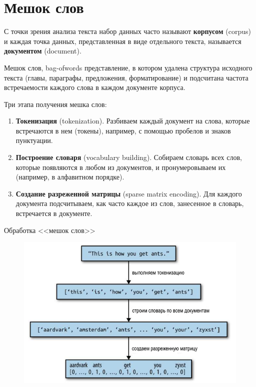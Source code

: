 \documentclass{beamer}
\begin{document}
\section{Мешок слов}

\begin{frame}
С точки зрения анализа текста набор данных часто называют \textbf{корпусом} (corpus) и каждая точка данных, представленная в виде отдельного текста, называется \textbf{документом} (document). 
\begin{block}{Мешок слов, bag-ofwords}
представление, в котором удалена структура исходного текста (главы, параграфы, предложения, форматирование) и подсчитана частота встречаемости каждого слова в каждом документе корпуса.
\end{block}
Три этапа получения мешка слов:
\begin{enumerate}
\item \textbf{Токенизация} (tokenization). Разбиваем каждый документ на слова, которые встречаются в нем (токены), например, с помощью пробелов и знаков пунктуации.
\item \textbf{Построение словаря} (vocabulary building). Собираем словарь всех слов, которые появляются в любом из документов, и пронумеровываем их (например, в алфавитном порядке).
\item \textbf{Создание разреженной матрицы} (sparse matrix encoding). Для каждого документа подсчитываем, как часто каждое из слов, занесенное в словарь, встречается в документе.
\end{enumerate}
\end{frame}

\begin{frame}{Обработка <<мешок слов>>}
\begin{figure}[h]
\centering
\includegraphics[scale=0.5]{images/lec09-pic06.png}
\end{figure}
\end{frame}
\end{document}
